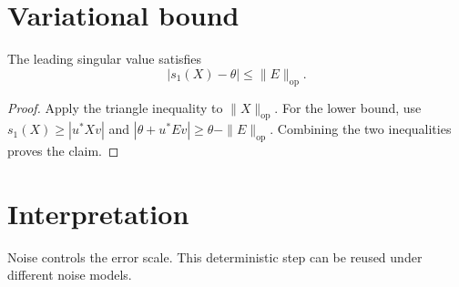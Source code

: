 \section{Variational bound}
\begin{claim}\label{thm:bound}
The leading singular value satisfies
\[|s_1(X)-\theta|\leq\|E\|_{\mathrm{op}}.\]
\end{claim}
\begin{proof}
Apply the triangle inequality to $\|X\|_{\mathrm{op}}$.
For the lower bound, use $s_1(X)\geq|u^*Xv|$ and
$|\theta+u^*Ev|\geq\theta-\|E\|_{\mathrm{op}}$.
Combining the two inequalities proves the claim.
\end{proof}
\section{Interpretation}
Noise controls the error scale.
This deterministic step can be reused under different noise models.
